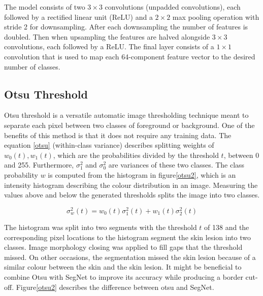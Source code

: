 The model consists of two $3\times3$ convolutions (unpadded convolutions), each followed by a rectified linear unit (ReLU) and a $2\times2$ max pooling operation with stride 2 for downsampling. After each downsampling the number of features is doubled. Then when upsampling the features are halved alongside $3\times3$ convolutions, each followed by a ReLU. The final layer consists of a $1\times1$ convolution that is used to map each 64-component feature vector to the desired number of classes. 




\subsection{Otsu Threshold}
Otsu threshold is a versatile automatic image thresholding technique meant to separate each pixel between two classes of foreground or background. One of the benefits of this method is that it does not require any training data. The equation \ref{otsu} (within-class variance) describes splitting weights of $w_0(t),w_1(t)$, which are the probabilities divided by the threshold $t$, between 0 and 255. Furthermore, $\sigma_1^2$ and $\sigma_0^2$ are variances of these two classes. The class probability $w$ is computed from the histogram in figure\ref{otsu2}, which is an intensity histogram describing the colour distribution in an image. Measuring the values above and below the generated thresholds splits the image into two classes.

\begin{equation}
\sigma_w^2(t) = w_0(t)\sigma_1^2(t) + w_1(t)\sigma_2^2(t)
\end{equation}\label{otsu}

The histogram was split into two segments with the threshold $t$ of 138 and the corresponding pixel locations to the histogram segment the skin lesion into two classes. Image morphology closing was applied to fill gaps that the threshold missed. On other occasions, the segmentation missed the skin lesion because of a similar colour between the skin and the skin lesion. It might be beneficial to combine Otsu with SegNet to improve its accuracy while producing a border cut-off. Figure\ref{otsu2} describes the difference between otsu and SegNet.

